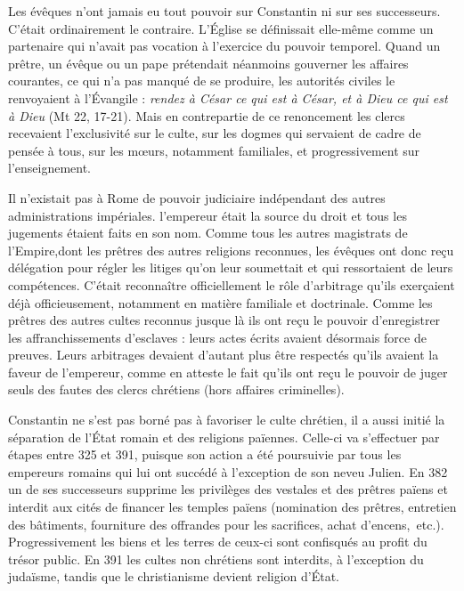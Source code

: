Les évêques n'ont jamais eu tout pouvoir sur Constantin ni sur ses successeurs. C'était ordinairement le contraire. L'Église se définissait elle-même comme un partenaire qui n'avait pas vocation à l'exercice du pouvoir temporel. Quand un prêtre, un évêque ou un pape prétendait néanmoins gouverner les affaires courantes, ce qui n'a pas manqué de se produire, les autorités civiles le renvoyaient à l'Évangile : \emph{rendez à César ce qui est à César, et à Dieu ce qui est à Dieu} (Mt 22, 17-21). Mais en contrepartie de ce renoncement les clercs recevaient l'exclusivité sur le culte, sur les dogmes qui servaient de cadre de pensée à tous, sur les mœurs, notamment familiales, et progressivement sur l'enseignement. 

 Il n'existait pas à Rome de pouvoir judiciaire indépendant des autres administrations impériales. l'empereur était la source du droit et tous les jugements étaient faits en son nom. Comme tous les autres magistrats de l'Empire,dont les prêtres des autres religions reconnues, les évêques ont donc reçu délégation pour régler les litiges qu'on leur soumettait et qui ressortaient de leurs compétences. C'était reconnaître officiellement le rôle d'arbitrage qu'ils exerçaient déjà officieusement, notamment en matière familiale et doctrinale. Comme les prêtres des autres cultes reconnus jusque là ils ont reçu le pouvoir d'enregistrer les affranchissements d'esclaves : leurs actes écrits avaient désormais force de preuves. Leurs arbitrages devaient d'autant plus être respectés qu'ils avaient la faveur de l'empereur, comme en atteste le fait qu'ils ont reçu le pouvoir de juger seuls des fautes des clercs chrétiens (hors affaires criminelles).
 
 Constantin ne s'est pas borné pas à favoriser le culte chrétien, il a aussi initié la séparation de l'État romain et des religions païennes. Celle-ci va s'effectuer par étapes entre 325 et 391, puisque son action a été poursuivie par tous les empereurs romains qui lui ont succédé à l'exception de son neveu Julien. En 382 un de ses successeurs supprime les privilèges des vestales et des prêtres païens et interdit aux cités de financer les temples païens (nomination des prêtres, entretien des bâtiments, fourniture des offrandes pour les sacrifices, achat d'encens,~etc.). Progressivement les biens et les terres de ceux-ci sont confisqués au profit du trésor public. En 391 les cultes non chrétiens sont interdits, à l'exception du judaïsme, tandis que le christianisme devient religion d'État. 

